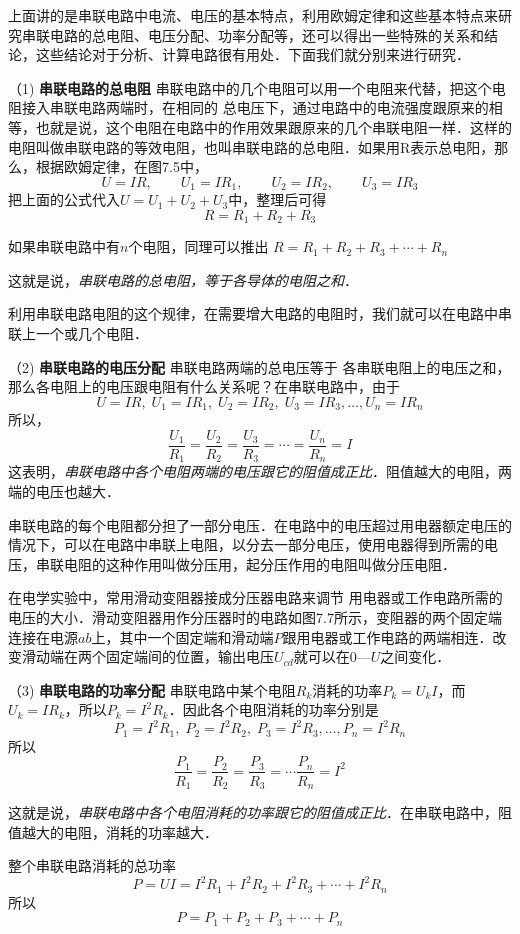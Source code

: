 上面讲的是串联电路中电流、电压的基本特点，利用欧姆定律和这些基本特点来研究串联电路的总电阻、电压分配、功率分配等，还可以得出一些特殊的关系和结论，这些结论对于分析、计算电路很有用处．下面我们就分别来进行研究．

（1) \textbf{串联电路的总电阻 } 串联电路中的几个电阻可以用一个电阻来代替，把这个电阻接入串联电路两端时，在相同的
总电压下，通过电路中的电流强度跟原来的相等，也就是说，这个电阻在电路中的作用效果跟原来的几个串联电阻一样．这样的电阻叫做串联电路的等效电阻，也叫串联电路的总电阻．如果用R表示总电阳，那么，根据欧姆定律，在图7.5中，
\[U=IR,\qquad  U_1=IR_1,\qquad U_2=IR_2,\qquad U_3=IR_3\]
把上面的公式代入$U=U_1+U_2+U_3$中，整理后可得
\[R=R_1+R_2+R_3\]

如果串联电路中有$n$个电阻，同理可以推出
$R=R_1+R_2+R_3+\cdots+R_n$

这就是说，\textit{串联电路的总电阻，等于各导体的电阻之和}．

利用串联电路电阻的这个规律，在需要增大电路的电阻时，我们就可以在电路中串联上一个或几个电阻．

（2) \textbf{串联电路的电压分配 } 串联电路两端的总电压等于
各串联电阻上的电压之和，那么各电阻上的电压跟电阻有什么关系呢？在串联电路中，由于
\[U=IR,\;  U_1=IR_1,\; U_2=IR_2,\; U_3=IR_3,\ldots, U_n=IR_n\]
所以，
\[\frac{U_1}{R_1}=\frac{U_2}{R_2}=\frac{U_3}{R_3}=\cdots=\frac{U_n}{R_n}=I \]
这表明，\textit{串联电路中各个电阻两端的电压跟它的阻值成正比}．阻值越大的电阻，两端的电压也越大．

串联电路的每个电阻都分担了一部分电压．在电路中的电压超过用电器额定电压的情况下，可以在电路中串联上电阻，以分去一部分电压，使用电器得到所需的电压，串联电阻的这种作用叫做分压用，起分压作用的电阻叫做分压电阻．

在电学实验中，常用滑动变阻器接成分压器电路来调节
用电器或工作电路所需的电压的大小．滑动变阻器用作分压器时的电路如图7.7所示，变阻器的两个固定端连接在电源$ab$上，其中一个固定端和滑动端$P$跟用电器或工作电路的两端相连．改变滑动端在两个固定端间的位置，输出电压$U_{cd}$就可以在0—$U$之间变化．

（3) \textbf{串联电路的功率分配 } 串联电路中某个电阻$R_k$消耗的功率$P_k=U_kI$，而$U_k=IR_k$，所以$P_k=I^2R_k$．因此各个电阻消耗的功率分别是
\[P_1=I^2R_1,\; P_2=I^2R_2,\; P_3=I^2R_3,\ldots, P_n=I^2R_n\]
所以
\[\frac{P_1}{R_1}=\frac{P_2}{R_2}=\frac{P_3}{R_3}=\cdots\frac{P_n}{R_n}=I^2 \]

这就是说，\textit{串联电路中各个电阻消耗的功率跟它的阻值成正比}．在串联电路中，阻值越大的电阻，消耗的功率越大．

整个串联电路消耗的总功率
\[P=UI=I^2R_1 +I^2R_2+I^2R_3+\cdots+I^2R_n
\]
所以
\[P=P_1+P_2+P_3+\cdots +P_n\]

